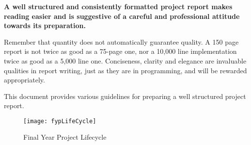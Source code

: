 \textbf{A well structured and consistently formatted project report makes reading easier and is suggestive of a careful and professional attitude towards its preparation. }

Remember that quantity does not automatically guarantee quality. A 150 page report is not twice as good as a 75-page one, nor a 10,000 line implementation twice as good as a 5,000 line one. Conciseness, clarity and elegance are invaluable qualities in report writing, just as they are in programming, and will be rewarded appropriately. 

This document provides various guidelines for preparing a well structured project report.

\begin{figure}[t]
\centering
\texttt{[image: fypLifeCycle]}
\caption{Final Year Project Lifecycle}
\label{fig:fypLifeCycle}
\end{figure}

